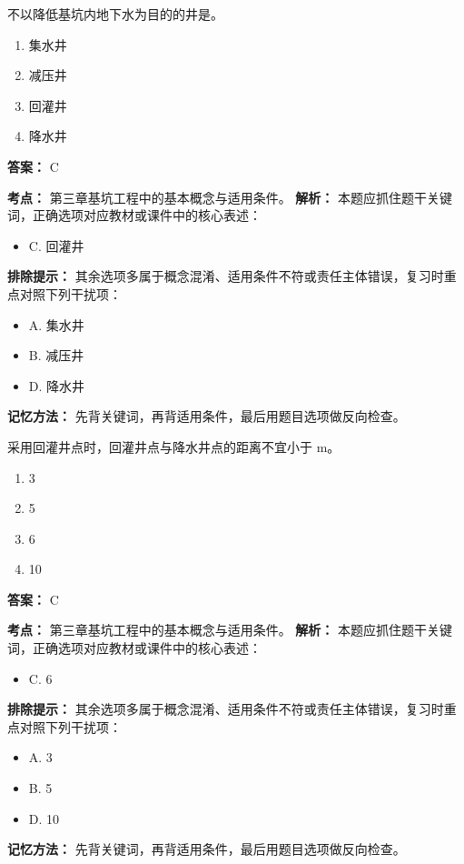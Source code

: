 \documentclass[UTF8,fontset=fandol,11pt]{ctexart}
\begin{document}
\begin{quizbox}[title={第 19 题}]
不以降低基坑内地下水为目的的井是。\\
\begin{enumerate}[label=\Alph*.]
\item 集水井
\item 减压井
\item 回灌井
\item 降水井
\end{enumerate}
\textbf{答案：} C
\vspace{0.25em}
\begin{answerbox}[title={考点解析}]
\textbf{考点：} 第三章基坑工程中的基本概念与适用条件。
\textbf{解析：} 本题应抓住题干关键词，正确选项对应教材或课件中的核心表述：
\begin{itemize}
\item C. 回灌井
\end{itemize}
\textbf{排除提示：} 其余选项多属于概念混淆、适用条件不符或责任主体错误，复习时重点对照下列干扰项：
\begin{itemize}
\item A. 集水井
\item B. 减压井
\item D. 降水井
\end{itemize}
\textbf{记忆方法：} 先背关键词，再背适用条件，最后用题目选项做反向检查。
\end{answerbox}
\end{quizbox}

\begin{quizbox}[title={第 20 题}]
采用回灌井点时，回灌井点与降水井点的距离不宜小于 m。\\
\begin{enumerate}[label=\Alph*.]
\item 3
\item 5
\item 6
\item 10
\end{enumerate}
\textbf{答案：} C
\vspace{0.25em}
\begin{answerbox}[title={考点解析}]
\textbf{考点：} 第三章基坑工程中的基本概念与适用条件。
\textbf{解析：} 本题应抓住题干关键词，正确选项对应教材或课件中的核心表述：
\begin{itemize}
\item C. 6
\end{itemize}
\textbf{排除提示：} 其余选项多属于概念混淆、适用条件不符或责任主体错误，复习时重点对照下列干扰项：
\begin{itemize}
\item A. 3
\item B. 5
\item D. 10
\end{itemize}
\textbf{记忆方法：} 先背关键词，再背适用条件，最后用题目选项做反向检查。
\end{answerbox}
\end{quizbox}
\end{document}
